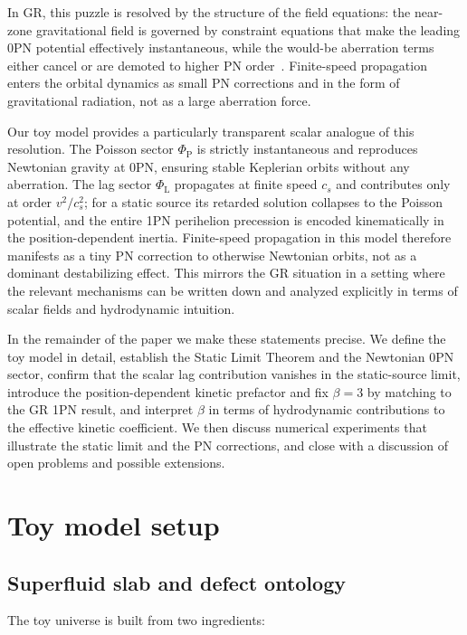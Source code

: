\documentclass[11pt]{article}
\newcommand{\cS}{c_s}
\newcommand{\PhiP}{\Phi_{\mathrm{P}}}
\newcommand{\PhiL}{\Phi_{\mathrm{L}}}
\begin{document}
In GR, this puzzle is resolved by the structure of the field equations: the near-zone gravitational field is governed by constraint equations that make the leading 0PN potential effectively instantaneous, while the would-be aberration terms either cancel or are demoted to higher PN order~\cite{Carlip:2000jd}. Finite-speed propagation enters the orbital dynamics as small PN corrections and in the form of gravitational radiation, not as a large aberration force.

Our toy model provides a particularly transparent scalar analogue of this resolution. The Poisson sector $\PhiP$ is strictly instantaneous and reproduces Newtonian gravity at 0PN, ensuring stable Keplerian orbits without any aberration. The lag sector $\PhiL$ propagates at finite speed $\cS$ and contributes only at order $v^2/\cS^2$; for a static source its retarded solution collapses to the Poisson potential, and the entire 1PN perihelion precession is encoded kinematically in the position-dependent inertia. Finite-speed propagation in this model therefore manifests as a tiny PN correction to otherwise Newtonian orbits, not as a dominant destabilizing effect. This mirrors the GR situation in a setting where the relevant mechanisms can be written down and analyzed explicitly in terms of scalar fields and hydrodynamic intuition.

In the remainder of the paper we make these statements precise. We define the toy model in detail, establish the Static Limit Theorem and the Newtonian 0PN sector, confirm that the scalar lag contribution vanishes in the static-source limit, introduce the position-dependent kinetic prefactor and fix $\beta = 3$ by matching to the GR 1PN result, and interpret $\beta$ in terms of hydrodynamic contributions to the effective kinetic coefficient. We then discuss numerical experiments that illustrate the static limit and the PN corrections, and close with a discussion of open problems and possible extensions.

\section{Toy model setup}
\label{sec:model}

\subsection{Superfluid slab and defect ontology}

The toy universe is built from two ingredients:
\end{document}
